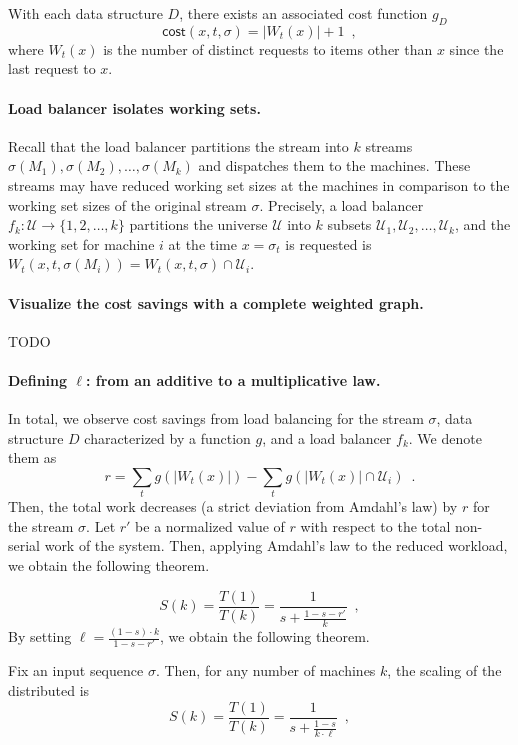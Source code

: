 With each data structure $D$, there exists an associated cost function $g_D$ 
\[
	\textsf{cost}(x, t, \sigma) = |W_t(x)|+1 \enspace ,
\]
where $W_t(x)$ is the number of distinct requests to items other than $x$ since the last request to $x$.

\paragraph*{Load balancer isolates working sets.}
Recall that the load balancer partitions the stream into $k$ streams $\sigma(M_1), \sigma(M_2), \ldots, \sigma(M_k)$ and dispatches them to the machines.
These streams may have reduced working set sizes at the machines in comparison to the working set sizes of the original stream $\sigma$.
Precisely, a load balancer $f_k : \mathcal{U} \to \{1, 2, \ldots, k\}$ partitions the universe $\mathcal{U}$ into $k$ subsets $\mathcal{U}_1, \mathcal{U}_2, \ldots, \mathcal{U}_k$, and the working set for machine $i$ at the time $x = \sigma_t$ is requested is $W_t(x, t, \sigma(M_i)) = W_t(x, t, \sigma) \cap \mathcal{U}_i$.

\paragraph*{Visualize the cost savings with a complete weighted graph.}
TODO

\paragraph*{Defining $\ell$: from an additive to a multiplicative law.}
In total, we observe cost savings from load balancing for the stream $\sigma$, data structure $D$ characterized by a function $g$, and a load balancer $f_k$. We denote them as
\[
	r = \sum_{t} g(|W_t(x)|) - \sum_{t} g(|W_t(x)| \cap \mathcal{U}_i) \enspace .
\]
Then, the total work decreases (a strict deviation from Amdahl's law) by $r$ for the stream $\sigma$. Let $r'$ be a normalized value of $r$ with respect to the total non-serial work of the system. Then, applying Amdahl's law to the reduced workload, we obtain the following theorem.


\begin{equation*}
  S(k) = \frac{T(1)}{T(k)} = \frac1{s + \frac{1-s - r'}{k}} \enspace ,
\end{equation*}
By setting $\ell = \frac{(1-s)\cdot k}{1-s-r'}$, we obtain the following theorem.

\begin{theorem}
	\label{thm:superlinear}
	Fix an input sequence $\sigma$.
	Then, for any number of machines $k$, the scaling of the distributed is 
	\begin{equation*}
	  S(k) = \frac{T(1)}{T(k)} = \frac1{s + \frac{1-s}{k \cdot \ell}} \enspace ,
	\end{equation*}
\end{theorem}


